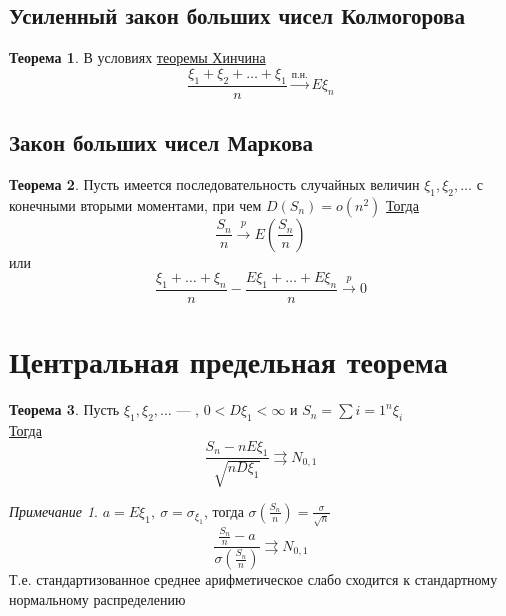 \documentclass[english]{article}
\theoremstyle{plain}
\theoremstyle{remark}
\newtheorem*{remark}{Примечание}
\theoremstyle{definition}
\newtheorem{theorem}{Теорема}[section]
\begin{document}
\subsection{Усиленный закон больших чисел Колмогорова}
\label{sec:orgb7ebc36}
\begin{theorem}
В условиях \hyperref[orgac8e644]{теоремы Хинчина}
\[ \frac{\xi_1 + \xi_2 + \dots + \xi_1}{n} \xrightarrow{\text{п.н.}} E\xi_n \]
\end{theorem}
\subsection{Закон больших чисел Маркова}
\label{sec:org404e2f4}
\begin{theorem}
Пусть имеется последовательность случайных величин \(\xi_1, \xi_2, \dots\) с конечными вторыми моментами, при чем \(D(S_n) = o(n^2)\)
\uline{Тогда}
\[ \frac{S_n}{n} \xrightarrow{p} E \left(\frac{S_n}{n}\right) \]
или
\[ \frac{\xi_1 + \dots + \xi_n}{n} - \frac{E\xi_1 + \dots + E\xi_n}{n} \xrightarrow{p} 0 \]
\end{theorem}
\section{Центральная предельная теорема}
\label{sec:org8a80e27}
\begin{theorem}
Пусть \(\xi_1, \xi_2, \dots\) --- , \(0 < D\xi_1 < \infty\) и \(S_n = \sum{i = 1}^n \xi_i\) \\
\uline{Тогда}
\[ \frac{S_n - nE\xi_1}{\sqrt{nD\xi_1}} \rightrightarrows N_{0,1} \]
\end{theorem}
\begin{remark}
\(a = E\xi_1,\ \sigma = \sigma_{\xi_1}\), тогда \(\sigma \left(\frac{S_n}{n}\right) = \frac{\sigma}{\sqrt{n}}\)
\[ \frac{\frac{S_n}{n} - a}{\sigma \left(\frac{S_n}{n}\right)} \rightrightarrows N_{0,1} \]
Т.е. стандартизованное среднее арифметическое слабо сходится к стандартному нормальному распределению
\end{remark}
\end{document}
